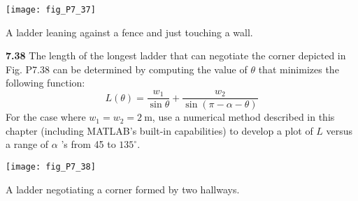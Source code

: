 \documentclass[../main.tex]{subfiles}
\begin{document}
\begin{multicols}{2}
	\begin{center}
	\texttt{[image: fig\_P7\_37]}
					
	\textsf{A ladder leaning against a fence and just touching a wall.}
	\end{center}

	\noindent \textbf{7.38} The length of the longest ladder that can negotiate the corner depicted in Fig. P7.38 can be determined by computing the value of $\theta$ that minimizes the following function:
	$$
	L(\theta)=\frac{w_{1}}{\sin \theta}+\frac{w_{2}}{\sin (\pi-\alpha-\theta)}
	$$
	For the case where $w_{1}=w_{2}=2 \mathrm{~m}$, use a numerical method described in this chapter (including MATLAB's built-in capabilities) to develop a plot of $L$ versus a range of $\alpha$ 's from 45 to $135^{\circ}$.

	\begin{center}
	\texttt{[image: fig\_P7\_38]}
						
	\textsf{A ladder negotiating a corner formed by two hallways.}
	\end{center}




\end{multicols}
\end{document}
